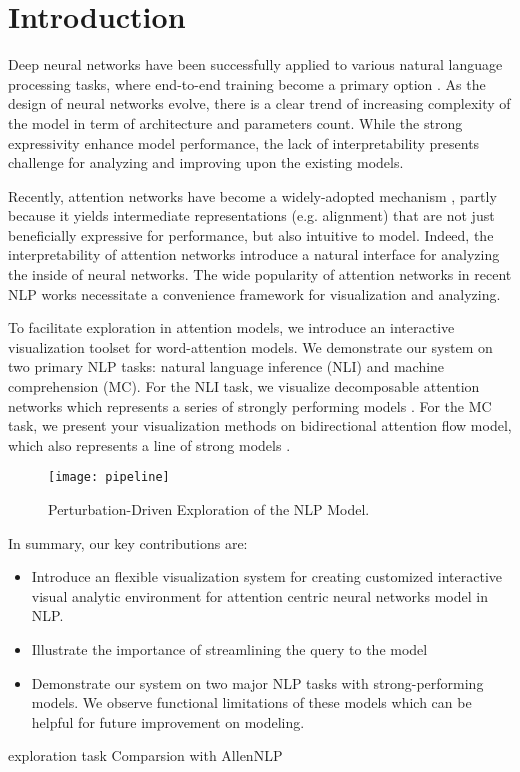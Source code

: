 \section{Introduction}

Deep neural networks have been successfully applied to various natural language processing tasks,
where end-to-end training become a primary option \cite{Seo2016}.
As the design of neural networks evolve, there is a clear trend of increasing complexity of the model in term of architecture and parameters count. 
While the strong expressivity enhance model performance, the lack of interpretability presents challenge for analyzing and improving upon the existing models.

Recently, attention networks have become a widely-adopted mechanism  \cite{VaswaniShazeerParmar2017, Parikh2016}, partly because it yields
intermediate representations (e.g. alignment) that are not just beneficially expressive for performance,
but also intuitive to model. Indeed, the interpretability of attention networks introduce
a natural interface for analyzing the inside of neural networks. The wide popularity of attention networks
in recent NLP works necessitate a convenience framework for visualization and analyzing.

To facilitate exploration in attention models, we introduce an interactive visualization toolset
for word-attention models. We demonstrate our system on two primary NLP tasks: natural language
inference (NLI) and machine comprehension (MC). For the NLI task, we visualize
decomposable attention networks which represents a series of strongly performing models \cite{}.
For the MC task, we present your visualization methods on bidirectional attention flow model,
which also represents a line of strong models \cite{}.

\begin{figure}[htbp]
\centering
\vspace{-2mm}
 \texttt{[image: pipeline]}
 \caption{
 Perturbation-Driven Exploration of the NLP Model.
 }
\label{fig:modelPipeline}
\end{figure}


In summary, our key contributions are:
\begin{itemize}
	\item Introduce an flexible visualization system for creating customized interactive visual analytic environment for attention centric neural networks model in NLP. 
	\item Illustrate the importance of streamlining the query to the model
	\item Demonstrate our system on two major NLP tasks with strong-performing
	models. We observe functional limitations of these models which can be helpful
	for future improvement on modeling.
\end{itemize}


exploration task
\cite{Seo2016}
Comparsion with AllenNLP
